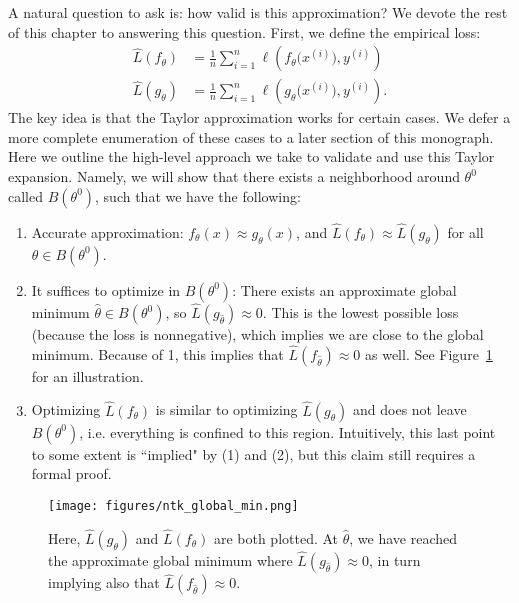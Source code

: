 A natural question to ask is: how valid is this approximation? We devote the rest of this chapter to answering this question. First, we define the empirical loss: 
\begin{align}
    \hat{L}(f_\theta) & = \frac{1}{n}\sum_{i=1}^n \ell \left( f_\theta\big( x^{(i)} \big) , y^{(i)} \right) \\ 
    \hat{L}(g_\theta) & = \frac{1}{n}\sum_{i=1}^n \ell \left( g_\theta\big( x^{(i)} \big) , y^{(i)} \right).
\end{align} 
The key idea is that the Taylor approximation works for certain cases. We defer a more complete enumeration of these cases to a later section of this monograph. Here we outline the high-level approach we take to validate and use this Taylor expansion. Namely, we will show that there exists a neighborhood around $\theta^0$ called $B(\theta^0)$, such that we have the following:
\begin{enumerate}
    \item Accurate approximation: $f_\theta(x) \approx g_\theta(x)$, and $\hat{L}(f_\theta) \approx \hat{L}(g_\theta)$ for all $\theta \in B(\theta^0)$.
    \item It suffices to optimize in $B(\theta^0)$: There exists an approximate global minimum $\hat{\theta} \in B(\theta^0)$, so $\hat{L}(g_{\hat{\theta}}) \approx 0$. This is the lowest possible loss (because the loss is nonnegative), which implies we are close to the global minimum. Because of 1, this implies that $\hat{L}(f_{\hat{\theta}}) \approx 0$ as well. See Figure~\ref{lec13:fig:ntkglobalmin} for an illustration.
    \item Optimizing $\hat{L} (f_\theta)$ is similar to optimizing $\hat{L}(g_\theta)$ and does not leave $B(\theta^0)$, i.e. everything is confined to this region. Intuitively, this last point to some extent is ``implied" by (1) and (2), but this claim still requires a formal proof. 
\end{enumerate}

\begin{figure}[ht!]
    \centering
    \texttt{[image: figures/ntk\_global\_min.png]}
    \caption{Here, $\hat{L}(g_{\theta})$ and $\hat{L}(f_{\theta})$ are both plotted. At $\hat{\theta}$, we have reached the approximate global minimum where $\hat{L}(g_{\hat{\theta}}) \approx 0$, in turn implying also that $\hat{L}(f_{\hat{\theta}}) \approx 0$.}
    \label{lec13:fig:ntkglobalmin}
\end{figure}

